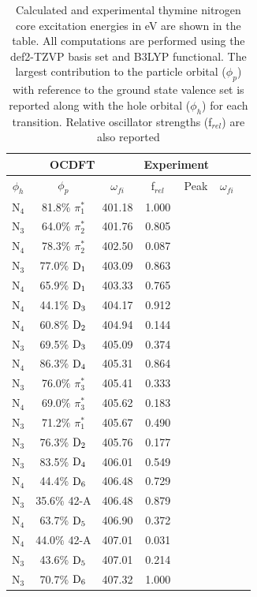 \documentclass[12pt]{article}
\begin{document}
    \begin{table}
 \centering
     \begin{tabular}{c@{\hskip 0.22in}c@{\hskip 0.22in}c@{\hskip 0.22in}c@{\hskip 0.52in}c@{\hskip 0.22in}c@{\hskip 0.22in}c}
     \hline
     \hline
   \multicolumn{3}{c}{OCDFT} &\multicolumn{2}{c}{Experiment} \\
   \hline
 $\phi_h$ &  $\phi_p$ & $\omega_{fi}$ & f$_{rel}$ & Peak &  $\omega_{fi}$   \\
   \hline
    N$_4$
 &   81.8$\%$ $\pi_1^*$  & 401.18 & 1.000 \\
    N$_3$
 &   64.0$\%$ $\pi_2^*$  & 401.76 & 0.805 \\
    N$_4$
 &   78.3$\%$ $\pi_2^*$  & 402.50 & 0.087 \\
    N$_3$
 &   77.0$\%$ $\rm D_1$  & 403.09 & 0.863 \\
    N$_4$
 &   65.9$\%$ $\rm D_1$  & 403.33 & 0.765 \\
    N$_4$
 &   44.1$\%$ $\rm D_3$  & 404.17 & 0.912 \\
    N$_4$
 &   60.8$\%$ $\rm D_2$  & 404.94 & 0.144 \\
    N$_3$
 &   69.5$\%$ $\rm D_3$  & 405.09 & 0.374 \\
    N$_4$
 &   86.3$\%$ $\rm D_4$  & 405.31 & 0.864 \\
    N$_3$
 &   76.0$\%$ $\pi_3^*$  & 405.41 & 0.333 \\
    N$_4$
 &   69.0$\%$ $\pi_3^*$  & 405.62 & 0.183 \\
    N$_3$
 &   71.2$\%$ $\pi_1^*$  & 405.67 & 0.490 \\
    N$_3$
 &   76.3$\%$ $\rm D_2$  & 405.76 & 0.177 \\
    N$_3$
 &   83.5$\%$ $\rm D_4$  & 406.01 & 0.549 \\
    N$_4$
 &   44.4$\%$ $\rm D_6$  & 406.48 & 0.729 \\
    N$_3$
 &   35.6$\%$ 42-A  & 406.48 & 0.879 \\
    N$_4$
 &   63.7$\%$ $\rm D_5$  & 406.90 & 0.372 \\
    N$_4$
 &   44.0$\%$ 42-A  & 407.01 & 0.031 \\
    N$_3$
 &   43.6$\%$ $\rm D_5$  & 407.01 & 0.214 \\
    N$_3$
 &   70.7$\%$ $\rm D_6$  & 407.32 & 1.000 \\
 \end{tabular}
  \caption{Calculated and experimental thymine nitrogen core excitation energies in eV are shown in the table. All computations are performed using the def2-TZVP basis set and B3LYP functional. The largest contribution to the particle orbital ($\phi_p$) with reference to the ground state valence set is reported along with the hole orbital ($\phi_h$) for each transition. Relative oscillator strengths (f$_{rel}$) are also reported}
   \label{table: thymine_k_nitrogen}
 \end{table}
\end{document}
